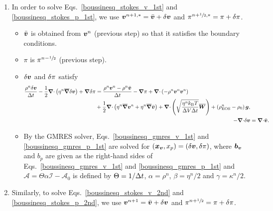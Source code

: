 \documentclass[
10pt
showpacs, showkeys,
amsmath,amssymb,
aps,
pre,
floatfix,
]{revtex4-1}
\newcommand{\divg}{{\V\nabla\cdot}}                       %
\begin{document}
\begin{enumerate}

\item In order to solve Eqs.~\eqref{boussinesq_stokes_v_1st} and \eqref{boussinesq_stokes_p_1st}, we use $\boldsymbol{v}^{n+1,*}=\bar{\boldsymbol{v}}+\delta\boldsymbol{v}$ and $\pi^{n+\sfrac{1}{2},*}=\pi+\delta\pi$.

\begin{itemize}
\item $\bar{\boldsymbol{v}}$ is obtained from $\boldsymbol{v}^n$ (previous step) so that it satisfies the boundary conditions.
\item $\pi$ is $\pi^{n-\sfrac{1}{2}}$ (previous step).
\item $\delta\boldsymbol{v}$ and $\delta\pi$ satisfy
\begin{align}
\label{boussinesq_gmres_v_1st}
\begin{split}
\frac{\rho^n\d{\V{v}}}{\D{t}} - \frac{1}{2}\divg\left(\eta^n\overline{\grad}\d{\V{v}}\right) + \grad\d{\pi}
& = \frac{\rho^n\V{v}^n-\rho^n\bar{\V{v}}}{\D{t}} - \grad\pi 
+ \divg\left(-\rho^n\V{v}^n\V{v}^n\right) \\
& + \frac{1}{2}\divg\left( \eta^n\overline{\grad}\V{v}^n + \eta^n\overline{\grad}\bar{\V{v}} \right)
+ \divg\left( \sqrt{\frac{\eta^n k_\mathrm{B}T}{\D{V}\D{t}} } \overline{\V{W}} \right) + \left(\rho^n_\mathrm{EOS}-\rho_0\right)\V{g},
\end{split} \\
\label{boussinesq_gmres_p_1st}
-\divg\d{\V{v}} &= \divg\bar{\V{v}}.
\end{align}
\item By the GMRES solver, Eqs.~\eqref{boussinesq_gmres_v_1st} and \eqref{boussinesq_gmres_p_1st} are solved for $(\boldsymbol{x}_{\boldsymbol{v}},x_p)=(\delta\boldsymbol{v},\delta\pi)$, where $\boldsymbol{b}_{\boldsymbol{v}}$ and $b_p$ are given as the right-hand sides of Eqs.~\eqref{boussinesq_gmres_v_1st} and \eqref{boussinesq_gmres_p_1st} and $\mathcal{A}=\Theta\alpha\mathcal{I}-\mathcal{A}_0$ is defined by $\Theta=1/\Delta t$, $\alpha=\rho^n$, $\beta=\eta^n/2$ and $\gamma=\kappa^n/2$.
\end{itemize}

\item Similarly, to solve Eqs.~\eqref{boussinesq_stokes_v_2nd} and \eqref{boussinesq_stokes_p_2nd}, we use $\boldsymbol{v}^{n+1}=\bar{\boldsymbol{v}}+\delta\boldsymbol{v}$ and $\pi^{n+\sfrac{1}{2}}=\pi+\delta\pi$.


\end{enumerate}
\end{document}
